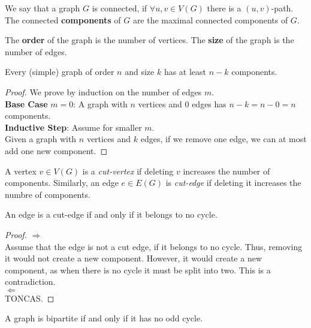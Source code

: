 We say that a graph $G$ is connected, if $\forall u,v \in V(G)$ there is a $(u,v)$-path. The connected \textbf{components} of $G$ are the maximal connected components of $G$.

The \textbf{order} of the graph is the number of vertices. The \textbf{size} of the graph is the number of edges.
\begin{proposition}
	Every (simple) graph of order $n$ and size $k$ has at least $n-k$ components.
\end{proposition}
\begin{proof}
	We prove by induction on the number of edges $m$.\\
	\noindent
	\textbf{Base Case} $m = 0$: A graph with $n$ vertices and $0$ edges has $n - k = n - 0 = n$ components.\\
	\noindent
	\textbf{Inductive Step}: Assume for smaller $m$.\\
	\noindent
	Given a graph with $n$ vertices and $k$ edges, if we remove one edge, we can at most add one new component.
\end{proof}

A vertex $v \in V(G)$ is a \textit{cut-vertex} if deleting $v$ increases the number of components. Similarly, an edge $e \in E(G)$ is \textit{cut-edge} if deleting it increases the numbre of components.

\begin{theorem}
	An edge is a cut-edge if and only if it belongs to no cycle.
\end{theorem}
\begin{proof}
	$\Rightarrow$\\
	\noindent
	Assume that the edge is not a cut edge, if it belongs to no cycle. Thus, removing it would not create a new component. However, it would create a new component, as when there is no cycle it must be split into two. This is a contradiction.\\
	\noindent
	$\Leftarrow$\\
	\noindent
	TONCAS.
\end{proof}

\begin{theorem}[König 1936]
	A graph is bipartite if and only if it has no odd cycle.
\end{theorem}

